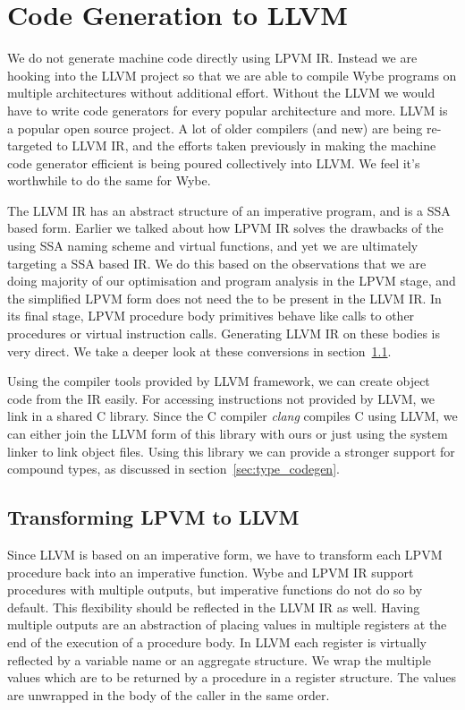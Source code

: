 \chapter{Code Generation to LLVM}
\label{chap:codegen_llvm}

We do not generate machine code directly using LPVM IR. Instead we are hooking
into the LLVM project so that we are able to compile Wybe programs on multiple
architectures without additional effort. Without the LLVM we would have to
write code generators for every popular architecture and more. LLVM is a
popular open source project. A lot of older compilers (and new) are being
re-targeted to LLVM IR, and the efforts taken previously in making the machine
code generator efficient is being poured collectively into LLVM. We feel it's
worthwhile to do the same for Wybe. 

The LLVM IR has an abstract structure of an imperative program, and is a SSA
based form. Earlier we talked about how LPVM IR solves the drawbacks of the
using SSA naming scheme and virtual functions, and yet we are ultimately
targeting a SSA based IR. We do this based on the observations that we are
doing majority of our optimisation and program analysis in the LPVM stage, and
the simplified LPVM form does not need the \phif to be present in the LLVM
IR. In its final stage, LPVM procedure body primitives behave like calls to
other procedures or virtual instruction calls. Generating LLVM IR on these
bodies is very direct. We take a deeper look at these conversions in
section~\ref{sec:lpvm_to_llvm}.

Using the compiler tools provided by LLVM framework, we can create object code
from the IR easily. For accessing instructions not provided by LLVM, we link in
a shared C library. Since the C compiler \textit{clang} compiles C using LLVM,
we can either join the LLVM form of this library with ours or just using the
system linker to link object files. Using this library we can provide a
stronger support for compound types, as discussed in
section~\ref{sec:type_codegen}.


\section{Transforming LPVM to LLVM}
\label{sec:lpvm_to_llvm}


Since LLVM is based on an imperative form, we have to transform each LPVM
procedure back into an imperative function. Wybe and LPVM IR support procedures
with multiple outputs, but imperative functions do not do so by default. This
flexibility should be reflected in the LLVM IR as well. Having multiple outputs
are an abstraction of placing values in multiple registers at the end of the
execution of a procedure body. In LLVM each register is virtually reflected by
a variable name or an aggregate structure. We wrap the multiple values which
are to be returned by a procedure in a register structure. The values are
unwrapped in the body of the caller in the same order.

